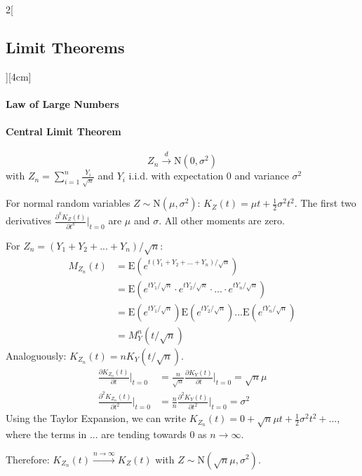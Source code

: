 \documentclass[8pt]{extarticle}
\begin{document}
\begin{multicols}{2}[\subsection{Limit Theorems}][4cm]

  \paragraph{Law of Large Numbers} \newpage
  
  \paragraph{Central Limit Theorem}
  
  $$Z_n \overset{d}{\longrightarrow} \mathrm{N}(0, \sigma^2)$$
  with  $Z_n = \sum_{i=1}^{n} \frac{Y_i}{\sqrt{n}}$ and $Y_i$ i.i.d. with expectation $0$ and variance $\sigma^2$
  
\begin{Proof}
For normal random variables $Z \sim \mathrm{N}(\mu, \sigma^2)$: $K_Z(t)=\mu t + \frac{1}{2}\sigma^2t^2$. The first two derivatives $\frac{\partial^kK_Z(t)}{\partial t^k} \bigg|_{t = 0}$ are $\mu$ and $\sigma$. All other moments are zero. 

\noindent For $Z_n = (Y_1 + Y_2 + ... +Y_n)/\sqrt{n}$:
\begin{align*}
M_{Z_n}(t) &= \mathrm{E}\left(e^{t(Y_1 + Y_2 + ... +Y_n)/\sqrt{n}}\right)\\
&= \mathrm{E}\left(e^{tY_1/\sqrt{n}} \cdot e^{tY_2/\sqrt{n}}\cdot ... \cdot e^{tY_n/\sqrt{n}}\right) \\
&= \mathrm{E}\left(e^{tY_1/\sqrt{n}}\right) \mathrm{E}\left(e^{tY_2/\sqrt{n}}\right) ... \mathrm{E}\left(e^{tY_n/\sqrt{n}}\right) \\
&= M_Y^n(t/\sqrt{n})
\end{align*}
Analoguously: $K_{Z_n}(t) = nK_Y(t/\sqrt{n})$.
\begin{align*}
 \frac{\partial K_{Z_n}(t)}{\partial t} \bigg|_{t = 0} &= \frac{n}{\sqrt{n}} \frac{\partial K_Y(t)}{\partial t} \bigg|_{t = 0} = \sqrt{n}\mu \\
 \frac{\partial^2K_{Z_n}(t)}{\partial t^2} \bigg|_{t = 0} &= \frac{n}{n} \frac{\partial^2 K_Y(t)}{\partial t^2} \bigg|_{t = 0} = \sigma^2
\end{align*}
Using the Taylor Expansion, we can write $K_{Z_n}(t) = 0 + \sqrt{n}\mu t + \frac{1}{2}\sigma^2t^2 + ...$, where the terms in $...$ are tending towards 0 as $n \rightarrow \infty$.

\noindent Therefore: $K_{Z_n}(t) \overset{n\rightarrow\infty}{\longrightarrow} K_{Z}(t)$ with $Z \sim \mathrm{N}(\sqrt{n}\mu,\sigma^2)$.
\end{Proof}

\end{multicols}
\end{document}
